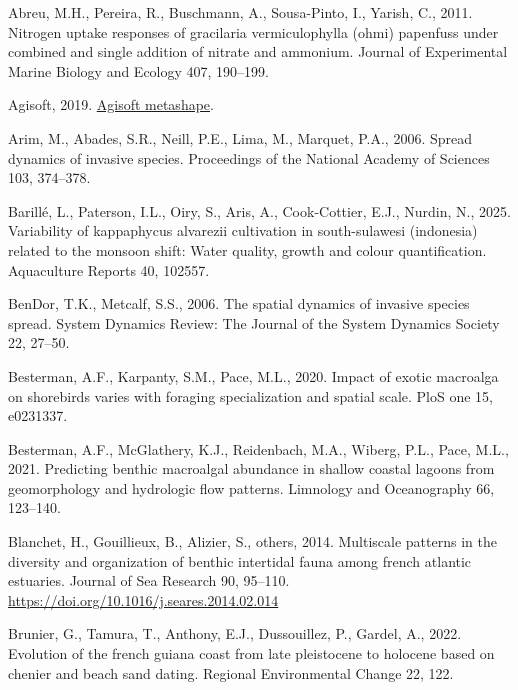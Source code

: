 \documentclass[
  letterpaper,
  DIV=11,
  numbers=noendperiod]{scrartcl}
\newlength{\cslhangindent}
\newenvironment{CSLReferences}[2] %
 {\begin{list}{}{%
  \setlength{\itemindent}{0pt}
  \setlength{\leftmargin}{0pt}
  \setlength{\parsep}{0pt}
  \ifodd #1
   \setlength{\leftmargin}{\cslhangindent}
   \setlength{\itemindent}{-1\cslhangindent}
  \fi
  \setlength{\itemsep}{#2\baselineskip}}}
 {\end{list}}
\begin{document}
\label{refs}
\begin{CSLReferences}{1}{0}
Abreu, M.H., Pereira, R., Buschmann, A., Sousa-Pinto, I., Yarish, C.,
2011. Nitrogen uptake responses of gracilaria vermiculophylla (ohmi)
papenfuss under combined and single addition of nitrate and ammonium.
Journal of Experimental Marine Biology and Ecology 407, 190--199.

Agisoft, 2019. \href{https://www.agisoft.com/}{Agisoft metashape}.

Arim, M., Abades, S.R., Neill, P.E., Lima, M., Marquet, P.A., 2006.
Spread dynamics of invasive species. Proceedings of the National Academy
of Sciences 103, 374--378.

Barillé, L., Paterson, I.L., Oiry, S., Aris, A., Cook-Cottier, E.J.,
Nurdin, N., 2025. Variability of kappaphycus alvarezii cultivation in
south-sulawesi (indonesia) related to the monsoon shift: Water quality,
growth and colour quantification. Aquaculture Reports 40, 102557.

BenDor, T.K., Metcalf, S.S., 2006. The spatial dynamics of invasive
species spread. System Dynamics Review: The Journal of the System
Dynamics Society 22, 27--50.

Besterman, A.F., Karpanty, S.M., Pace, M.L., 2020. Impact of exotic
macroalga on shorebirds varies with foraging specialization and spatial
scale. PloS one 15, e0231337.

Besterman, A.F., McGlathery, K.J., Reidenbach, M.A., Wiberg, P.L., Pace,
M.L., 2021. Predicting benthic macroalgal abundance in shallow coastal
lagoons from geomorphology and hydrologic flow patterns. Limnology and
Oceanography 66, 123--140.

Blanchet, H., Gouillieux, B., Alizier, S., others, 2014. Multiscale
patterns in the diversity and organization of benthic intertidal fauna
among french atlantic estuaries. Journal of Sea Research 90, 95--110.
\url{https://doi.org/10.1016/j.seares.2014.02.014}

Brunier, G., Tamura, T., Anthony, E.J., Dussouillez, P., Gardel, A.,
2022. Evolution of the french guiana coast from late pleistocene to
holocene based on chenier and beach sand dating. Regional Environmental
Change 22, 122.


\end{CSLReferences}
\end{document}
